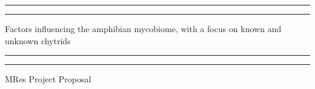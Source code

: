 \documentclass[11pt, a4paper, titlepage]{article}
\begin{document}
\begin{titlepage} %
	
	\centering %
	
	\scshape %
	
	\vspace*{\baselineskip} %
	
	
	
	
	\rule{\textwidth}{1.6pt}\vspace*{-\baselineskip}\vspace*{2pt} %
	
	\rule{\textwidth}{0.4pt} %
	
	\vspace{0.75\baselineskip} %
	
	{\LARGE Factors influencing the amphibian mycobiome, with a focus on known and unknown chytrids \\} %
	
	\vspace{0.75\baselineskip} %

	\rule{\textwidth}{0.4pt}\vspace*{-\baselineskip}\vspace{3.2pt} %
	
	\rule{\textwidth}{1.6pt} %
	
	\vspace{2\baselineskip} %
	
	
	
	
	MRes Project Proposal %
	
	\vspace*{3\baselineskip} %
	
	
	
	

\end{titlepage}
\end{document}
